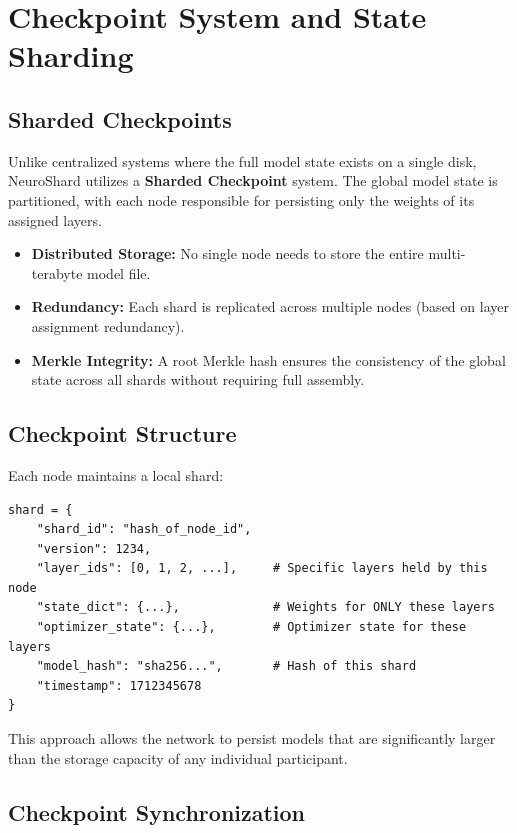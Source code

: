 \documentclass[11pt,a4paper]{article}
\begin{document}
\section{Checkpoint System and State Sharding}

\subsection{Sharded Checkpoints}

Unlike centralized systems where the full model state exists on a single disk, NeuroShard utilizes a \textbf{Sharded Checkpoint} system. The global model state is partitioned, with each node responsible for persisting only the weights of its assigned layers.

\begin{itemize}
    \item \textbf{Distributed Storage:} No single node needs to store the entire multi-terabyte model file.
    \item \textbf{Redundancy:} Each shard is replicated across multiple nodes (based on layer assignment redundancy).
    \item \textbf{Merkle Integrity:} A root Merkle hash ensures the consistency of the global state across all shards without requiring full assembly.
\end{itemize}

\subsection{Checkpoint Structure}

Each node maintains a local shard:

\begin{lstlisting}[caption=Sharded Checkpoint Structure]
shard = {
    "shard_id": "hash_of_node_id",
    "version": 1234,
    "layer_ids": [0, 1, 2, ...],     # Specific layers held by this node
    "state_dict": {...},             # Weights for ONLY these layers
    "optimizer_state": {...},        # Optimizer state for these layers
    "model_hash": "sha256...",       # Hash of this shard
    "timestamp": 1712345678
}
\end{lstlisting}

This approach allows the network to persist models that are significantly larger than the storage capacity of any individual participant.

\subsection{Checkpoint Synchronization}
\end{document}
